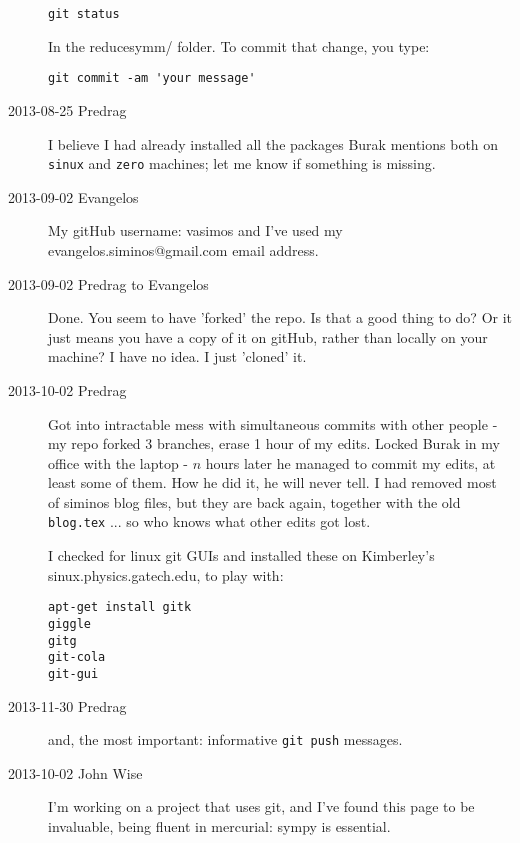 \begin{description}
\begin{verbatim}
git status
\end{verbatim}

In the reducesymm/ folder. To commit that change, you type:

\begin{verbatim}
git commit -am 'your message'
\end{verbatim}

\item[2013-08-25 Predrag] I believe I had already installed all the
packages Burak mentions both on \texttt{sinux} and \texttt{zero}
machines; let me know if something is missing.

\item[2013-09-02 Evangelos]
My gitHub username: vasimos and I've used my evangelos.siminos@gmail.com email address.


\item[2013-09-02 Predrag to Evangelos] Done. You seem to have 'forked' the repo. Is that a good thing to do? Or it just means you have a copy of it
    on gitHub, rather than locally on your machine? I have no idea. I just 'cloned' it.

\item[2013-10-02 Predrag] Got into intractable mess with simultaneous commits with other
people - my repo forked 3 branches, erase 1 hour of my edits. Locked Burak in my office
with the laptop - $n$ hours later he managed to commit my edits, at least some of them.
How he did it, he will never tell.
I had removed most of siminos blog files, but they are back again, together with the old
\texttt{blog.tex} ... so who knows what
other edits got lost.

I checked for linux
\HREF{} {git GUIs} and installed these on Kimberley's sinux.physics.gatech.edu,
to play with:

\texttt{apt-get install gitk}
\\
     \texttt{giggle}
\\
     \texttt{gitg}
\\
    \texttt{git-cola}
 \\
    \texttt{git-gui}

\item[2013-11-30 Predrag] and, the most important:
 {informative} \texttt{git push} messages.

\item[2013-10-02 John Wise]
I'm working on a project that uses git, and I've found this page to be
invaluable, being fluent in mercurial:
 {sympy}
is essential.

\end{description}

